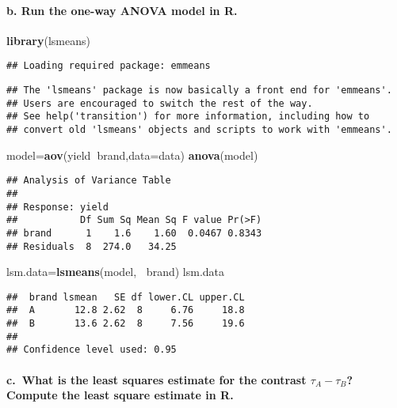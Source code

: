 \documentclass[
]{article}
\newenvironment{Shaded}{\begin{snugshade}}{\end{snugshade}}
\newcommand{\DataTypeTok}[1]{\textcolor[rgb]{0.13,0.29,0.53}{#1}}
\newcommand{\KeywordTok}[1]{\textcolor[rgb]{0.13,0.29,0.53}{\textbf{#1}}}
\newcommand{\NormalTok}[1]{#1}
\newcommand{\OperatorTok}[1]{\textcolor[rgb]{0.81,0.36,0.00}{\textbf{#1}}}
\begin{document}
\hypertarget{b.-run-the-one-way-anova-model-in-r.}{%
\paragraph{b. Run the one-way ANOVA model in
R.}\label{b.-run-the-one-way-anova-model-in-r.}}

\begin{Shaded}
\begin{Highlighting}[]
\KeywordTok{library}\NormalTok{(lsmeans)}
\end{Highlighting}
\end{Shaded}

\begin{verbatim}
## Loading required package: emmeans
\end{verbatim}

\begin{verbatim}
## The 'lsmeans' package is now basically a front end for 'emmeans'.
## Users are encouraged to switch the rest of the way.
## See help('transition') for more information, including how to
## convert old 'lsmeans' objects and scripts to work with 'emmeans'.
\end{verbatim}

\begin{Shaded}
\begin{Highlighting}[]
\NormalTok{model=}\KeywordTok{aov}\NormalTok{(yield}\OperatorTok{~}\NormalTok{brand,}\DataTypeTok{data=}\NormalTok{data)}
\KeywordTok{anova}\NormalTok{(model)}
\end{Highlighting}
\end{Shaded}

\begin{verbatim}
## Analysis of Variance Table
## 
## Response: yield
##           Df Sum Sq Mean Sq F value Pr(>F)
## brand      1    1.6    1.60  0.0467 0.8343
## Residuals  8  274.0   34.25
\end{verbatim}

\begin{Shaded}
\begin{Highlighting}[]
\NormalTok{lsm.data=}\KeywordTok{lsmeans}\NormalTok{(model, }\OperatorTok{~}\NormalTok{brand)}
\NormalTok{lsm.data}
\end{Highlighting}
\end{Shaded}

\begin{verbatim}
##  brand lsmean   SE df lower.CL upper.CL
##  A       12.8 2.62  8     6.76     18.8
##  B       13.6 2.62  8     7.56     19.6
## 
## Confidence level used: 0.95
\end{verbatim}

\hypertarget{c.-what-is-the-least-squares-estimate-for-the-contrast-ux3c4_aux3c4_b-compute-the-least-square-estimate-in-r.}{%
\paragraph{\texorpdfstring{c.~What is the least squares estimate for the
contrast \(τ_A−τ_B\)? Compute the least square estimate in
R.}{c.~What is the least squares estimate for the contrast τ\_A−τ\_B? Compute the least square estimate in R.}}\label{c.-what-is-the-least-squares-estimate-for-the-contrast-ux3c4_aux3c4_b-compute-the-least-square-estimate-in-r.}}
\end{document}
